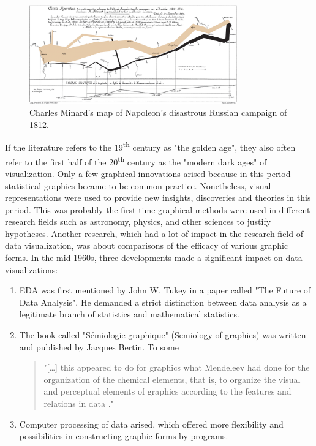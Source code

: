 \begin{figure}[!htb]
\centering
\includegraphics[width=0.8\textwidth,keepaspectratio]{images/history/minard2.png}
\caption[
    Charles Minard's map of Napoleon's disastrous Russian campaign of 1812., Urldate: 07.2016 \newline
\small\texttt{\url{https://upload.wikimedia.org/wikipedia/commons/2/29/Minard.png}}
]{Charles Minard's map of Napoleon's disastrous Russian campaign of 1812.}
\label{fig:minard2}
\end{figure}

If the literature refers to the 19\textsuperscript{th} century as "the golden age", they also often refer to the first half of the 20\textsuperscript{th} century as the "modern dark ages" of visualization. Only a few graphical innovations arised because in this period statistical graphics became to be common practice. Nonetheless, visual representations were used to provide new insights, discoveries and theories in this period. This was probably the first time graphical methods were used in different research fields such as astronomy, physics, and other sciences to justify hypotheses. Another research, which had a lot of impact in the research field of data visualization, was about comparisons of the efficacy of various graphic forms. In the mid 1960s, three developments made a significant impact on data visualizations:
\begin{enumerate}
\item \ac{EDA} was first mentioned by John W. Tukey in a paper called "The Future of Data Analysis". He demanded a strict distinction between data analysis as a legitimate branch of statistics and mathematical statistics.
\item The book called "Sémiologie graphique" (Semiology of graphics) was written and published by Jacques Bertin. To some
\begin{quote}
"[\ldots] this appeared to do for graphics what Mendeleev had done for the organization of the chemical elements, that is, to organize the visual and perceptual elements of graphics according to the features and relations in data ."
\end{quote}
\label{crossref:bertain}
\item Computer processing of data arised, which offered more flexibility and possibilities in constructing graphic forms by programs.
\end{enumerate}

